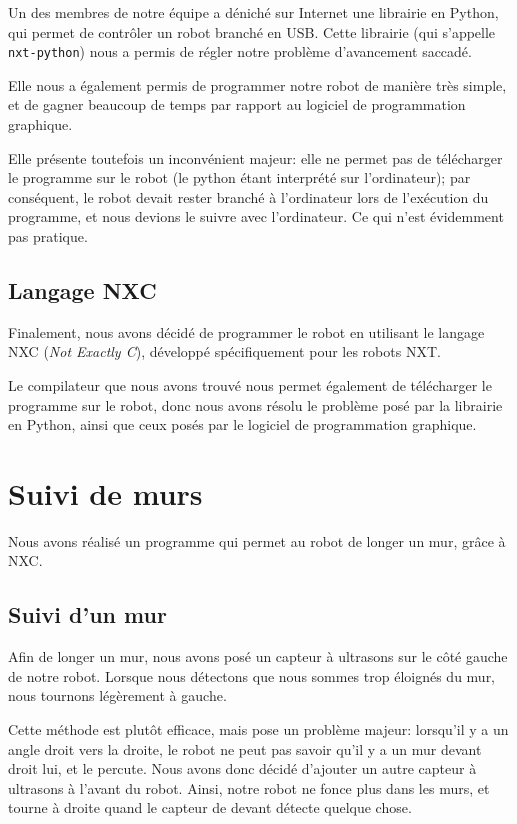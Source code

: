 \documentclass{scrartcl}
\begin{document}
Un des membres de notre équipe a déniché sur Internet une librairie en
Python, qui permet de contrôler un robot branché en USB. Cette
librairie (qui s'appelle \texttt{nxt-python}) nous a permis de régler
notre problème d'avancement saccadé.

Elle nous a également permis de programmer notre robot de manière très
simple, et de gagner beaucoup de temps par rapport au logiciel de
programmation graphique.

Elle présente toutefois un inconvénient majeur: elle ne permet pas de télécharger
le programme sur le robot (le python étant interprété sur l'ordinateur);
par conséquent, le robot devait rester branché à l'ordinateur lors de
l'exécution du programme, et nous devions le suivre avec l'ordinateur. Ce qui
n'est évidemment pas pratique.

\subsection{Langage NXC}

Finalement, nous avons décidé de programmer le robot en utilisant le
langage NXC (\emph{Not Exactly C}), développé spécifiquement pour
les robots NXT.

Le compilateur que nous avons trouvé nous permet également de
télécharger le programme sur le robot, donc nous avons résolu le
problème posé par la librairie en Python, ainsi que ceux posés par le
logiciel de programmation graphique.

\section{Suivi de murs}

Nous avons réalisé un programme qui permet au robot de longer un mur, grâce
à NXC.

\subsection{Suivi d'un mur}

Afin de longer un mur, nous avons posé un capteur à ultrasons sur le
côté gauche de notre robot. Lorsque nous détectons que nous sommes
trop éloignés du mur, nous tournons légèrement à gauche.

Cette méthode est plutôt efficace, mais pose un problème majeur:
lorsqu'il y a un angle droit vers la droite, le robot ne peut pas savoir qu'il y a un mur
devant droit lui, et le percute.
Nous avons donc décidé d'ajouter un autre capteur à ultrasons à l'avant du robot. Ainsi,
notre robot ne fonce plus dans les murs, et tourne à droite quand le
capteur de devant détecte quelque chose.
\end{document}
